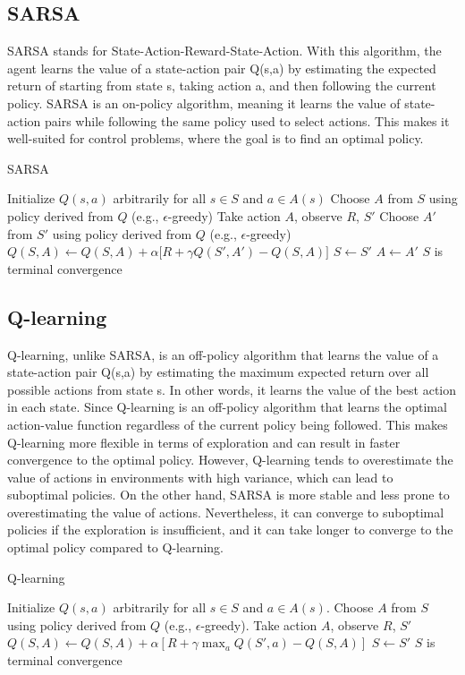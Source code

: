 \subsection{SARSA}
SARSA stands for State-Action-Reward-State-Action. With this algorithm, the agent learns the value of a state-action pair Q(s,a) by estimating the expected return of starting from state s, taking action a, and then following the current policy. SARSA is an on-policy algorithm, meaning it learns the value of state-action pairs while following the same policy used to select actions. This makes it well-suited for control problems, where the goal is to find an optimal policy.
\begin{algorithm}
\caption{SARSA}\label{algo:S}
\begin{algorithmic}[1]
\State Initialize $Q(s,a)$ arbitrarily for all $s\in S$ and $a\in A(s)$
\Repeat
\State Choose $A$ from $S$ using policy derived from $Q$ (e.g., $\epsilon$-greedy)
\Repeat
\State Take action $A$, observe $R$, $S'$
\State Choose $A'$ from $S'$ using policy derived from $Q$ (e.g., $\epsilon$-greedy)
\State $Q(S,A) \gets Q(S,A) + \alpha \big[ R + \gamma Q(S',A') - Q(S,A) \big]$
\State $S \gets S'$
\State $A \gets A'$
\Until $S$ is terminal
\Until convergence
\end{algorithmic}
\end{algorithm}

\subsection{Q-learning}
Q-learning, unlike SARSA, is an off-policy algorithm that learns the value of a state-action pair Q(s,a) by estimating the maximum expected return over all possible actions from state s. In other words, it learns the value of the best action in each state. Since Q-learning is an off-policy algorithm that learns the optimal action-value function regardless of the current policy being followed. This makes Q-learning more flexible in terms of exploration and can result in faster convergence to the optimal policy. However, Q-learning tends to overestimate the value of actions in environments with high variance, which can lead to suboptimal policies. On the other hand, SARSA is more stable and less prone to overestimating the value of actions. Nevertheless, it can converge to suboptimal policies if the exploration is insufficient, and it can take longer to converge to the optimal policy compared to Q-learning.
\begin{algorithm}
\caption{Q-learning}\label{algo:QL}
\begin{algorithmic}[1]
\State Initialize $Q(s,a)$ arbitrarily for all $s \in S$ and $a \in A(s)$.
\Repeat
\Repeat
\State Choose $A$ from $S$ using policy derived from $Q$ (e.g., $\epsilon$-greedy).
\State Take action $A$, observe $R$, $S'$
\State $Q(S,A) \gets Q(S,A) + \alpha \left[R + \gamma \max_a Q(S',a) - Q(S,A)\right]$
\State $S \gets S'$
\Until $S$ is terminal
\Until convergence
\end{algorithmic}
\end{algorithm}

